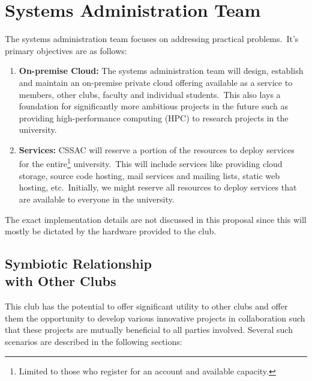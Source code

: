 

\section{\large Systems Administration Team}\label{sec:systems-administration-team}
The systems administration team focuses on addressing practical problems.\ It's primary objectives are as follows:

\begin{enumerate}
    \item \textbf{On-premise Cloud:} The systems administration team will design, establish and maintain an on-premise
    private cloud offering available as a service to members, other clubs, faculty and individual students.\ This also
    lays a foundation for significantly more ambitious projects in the future such as providing high-performance
    computing (HPC) to research projects in the university.
    \item \textbf{Services:} CSSAC will reserve a portion of the resources to deploy services for the
    entire\footnote{Limited to those who register for an account and available capacity.} university.\ This will include
    services like providing cloud storage, source code hosting, mail services and mailing lists, static web hosting,
    etc.\ Initially, we might reserve all resources to deploy services that are available to everyone in the university.
\end{enumerate}

The exact implementation details are not discussed in this proposal since this will mostly be dictated by the hardware
provided to the club.


\subsection[Symbiotic Relationship with Other Clubs]{Symbiotic Relationship \\ with Other Clubs}
\label{subsec:symbiotic-relationship-with-other-clubs}
This club has the potential to offer significant utility to other clubs and offer them the opportunity to develop
various innovative projects in collaboration such that these projects are mutually beneficial to all parties involved.
Several such scenarios are described in the following sections:

